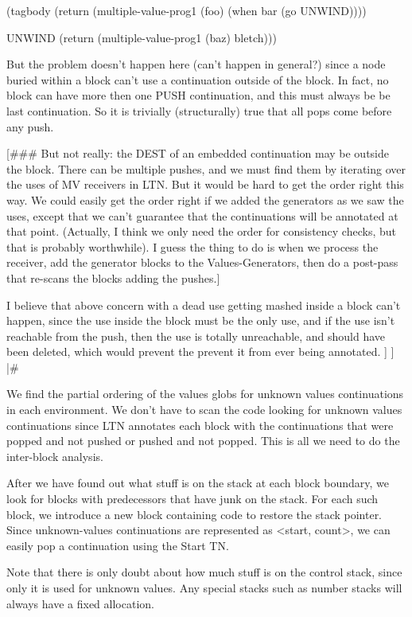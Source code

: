    (tagbody
      (return
       (multiple-value-prog1 (foo)
	 (when bar
	   (go UNWIND))))

     UNWIND
      (return
       (multiple-value-prog1 (baz)
	 bletch)))

But the problem doesn't happen here (can't happen in general?) since a node
buried within a block can't use a continuation outside of the block.  In fact,
no block can have more then one PUSH continuation, and this must always be be
last continuation.  So it is trivially (structurally) true that all pops come
before any push.

[\#\#\# But not really: the DEST of an embedded continuation may be outside the
block.  There can be multiple pushes, and we must find them by iterating over
the uses of MV receivers in LTN.  But it would be hard to get the order right
this way.  We could easily get the order right if we added the generators as we
saw the uses, except that we can't guarantee that the continuations will be
annotated at that point.  (Actually, I think we only need the order for
consistency checks, but that is probably worthwhile).  I guess the thing to do
is when we process the receiver, add the generator blocks to the
Values-Generators, then do a post-pass that re-scans the blocks adding the
pushes.]

I believe that above concern with a dead use getting mashed inside a block
can't happen, since the use inside the block must be the only use, and if the
use isn't reachable from the push, then the use is totally unreachable, and
should have been deleted, which would prevent the prevent it from ever being
annotated.
]
]
|\#

We find the partial ordering of the values globs for unknown values
continuations in each environment.  We don't have to scan the code looking for
unknown values continuations since LTN annotates each block with the
continuations that were popped and not pushed or pushed and not popped.  This
is all we need to do the inter-block analysis.

After we have found out what stuff is on the stack at each block boundary, we
look for blocks with predecessors that have junk on the stack.  For each such
block, we introduce a new block containing code to restore the stack pointer.
Since unknown-values continuations are represented as <start, count>, we can
easily pop a continuation using the Start TN.

Note that there is only doubt about how much stuff is on the control stack,
since only it is used for unknown values.  Any special stacks such as number
stacks will always have a fixed allocation.

